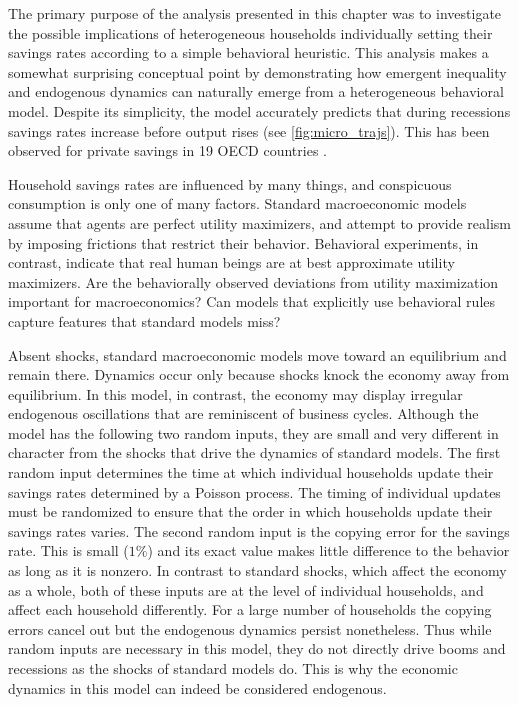 The primary purpose of the analysis presented in this chapter was to investigate the possible implications of heterogeneous households individually setting their savings rates according to a simple behavioral heuristic. This analysis makes a somewhat surprising conceptual point by demonstrating how emergent inequality and endogenous dynamics can naturally emerge from a heterogeneous behavioral model. Despite its simplicity, the model accurately predicts that during recessions savings rates increase before output rises (see \cref{fig:micro_trajs}).
This has been observed for private savings in 19 OECD countries \citep{adema2015business}. 

Household savings rates are influenced by many things, and conspicuous consumption is only one of many factors. Standard macroeconomic models assume that agents are perfect utility maximizers, and attempt to provide realism by imposing frictions that restrict their behavior. Behavioral experiments, in contrast, indicate that real human beings are at best approximate utility maximizers.  Are the behaviorally observed deviations from utility maximization important for macroeconomics?  Can models that explicitly use behavioral rules capture features that standard models miss?

Absent shocks, standard macroeconomic models move toward an equilibrium and remain there.   Dynamics occur only because shocks knock the economy away from equilibrium. In this model, in contrast, the economy may display irregular endogenous oscillations that are reminiscent of business cycles.  
Although the model has the following two random inputs, they are small and very different in character from the shocks that drive the dynamics of standard models. The first random input determines the time at which individual households update their savings rates determined by a Poisson process. The timing of individual updates must be randomized to ensure that the order in which households update their savings rates varies. The second random input is the copying error for the savings rate.  This is small ($1\%$) and its exact value makes little difference to the behavior as long as it is nonzero. In contrast to standard shocks, which affect the economy as a whole, both of these inputs are at the level of individual households, and affect each household differently. For a large number of households the copying errors cancel out but the endogenous dynamics persist nonetheless. Thus while random inputs are necessary in this model, they do not directly drive booms and recessions as the shocks of standard models do. This is why the economic dynamics in this model can indeed be considered endogenous.


